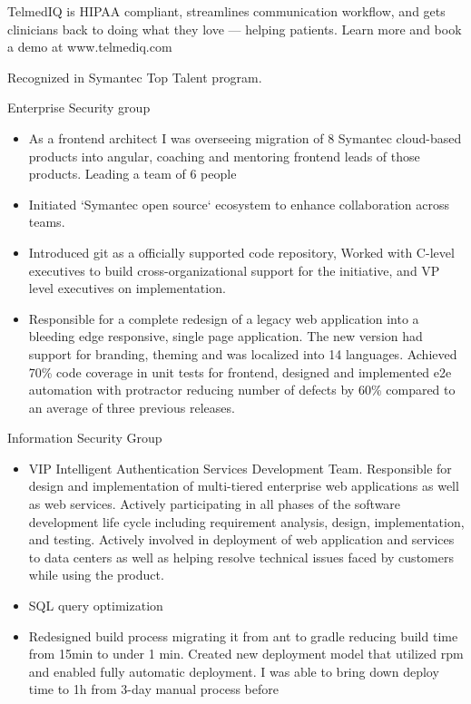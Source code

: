 \documentclass[11pt,a4paper,roman]{moderncv}       %
\begin{document}
TelmedIQ is HIPAA compliant, streamlines communication workflow, and gets clinicians back to doing what they love — helping patients. Learn more and book a demo at www.telmediq.com

\vspace{16pt}


Recognized in Symantec Top Talent program.


Enterprise Security group
\begin{itemize}
    \item As a frontend architect I was overseeing migration of 8 Symantec cloud-based products into angular, coaching and mentoring frontend leads of those products. Leading a team of 6 people
    \item Initiated `Symantec open source` ecosystem to enhance collaboration across teams. 
    \item Introduced git as a officially supported code repository, Worked with C-level executives to build cross-organizational support for the initiative, and VP level executives on implementation.
    \item Responsible for a complete redesign of a legacy web application into a bleeding edge responsive, single page application. The new version had support for branding, theming and was localized into 14 languages. Achieved 70\% code coverage in unit tests for frontend, designed and implemented e2e automation with protractor reducing number of defects by 60\% compared to an average of three previous releases.
\end{itemize}


Information Security Group

\begin{itemize}
    \item VIP Intelligent Authentication Services Development Team. Responsible for design and implementation of multi-tiered enterprise web applications as well as web services. Actively participating in all phases of the software development life cycle including requirement analysis, design, implementation, and testing. Actively involved in deployment of web application and services to data centers as well as helping resolve technical issues faced by customers while using the product.
    \item SQL query optimization
    \item Redesigned build process migrating it from ant to gradle reducing build time from 15min to under 1 min. Created new deployment model that utilized rpm and enabled fully automatic deployment. I was able to bring down deploy time to 1h from 3-day manual process before
\end{itemize}
\end{document}
